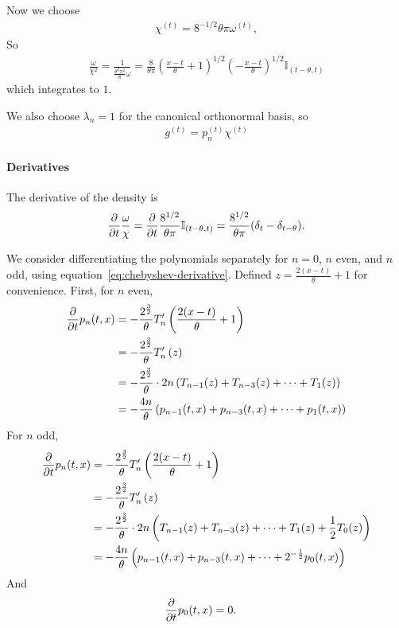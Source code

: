 \documentclass[../../hippo]{subfiles}
\begin{document}
Now we choose
\begin{align*}
  \chi^{(t)} = 8^{-1/2} \theta \pi \omega^{(t)},
\end{align*}
So
\begin{align*}
  \frac{\omega}{\chi^2} = \frac{1}{\frac{\theta^2\pi^2}{8}\omega} = \frac{8}{\theta \pi} \left( \frac{x-t}{\theta} + 1 \right)^{1/2} \left( -\frac{x-t}{\theta} \right)^{1/2} \mathbb{I}_{(t-\theta, t)}
\end{align*}
which integrates to $1$.


We also choose $\lambda_n = 1$ for the canonical orthonormal basis, so
\begin{align*}
  g^{(t)} = p_n^{(t)} \chi^{(t)}
\end{align*}


\paragraph{Derivatives}

The derivative of the density is
\begin{align*}
  \frac{\partial}{\partial t} \frac{\omega}{\chi} = \frac{\partial}{\partial t} \frac{8^{1/2}}{\theta\pi}\mathbb{I}_{(t-\theta, t)} = \frac{8^{1/2}}{\theta\pi}(\delta_t - \delta_{t-\theta}).
\end{align*}

We consider differentiating the polynomials separately for $n = 0$, $n$ even, and $n$ odd,
using equation~\eqref{eq:chebyshev-derivative}.
Defined $z = \frac{2(x-t)}{\theta} + 1$ for convenience.
First, for $n$ even,
\begin{align*}%
  \ppt p_n(t, x) &= -\frac{2^{\frac{3}{2}}}{\theta} T_n'\left( \frac{2(x-t)}{\theta} + 1 \right)
  \\
  &= -\frac{2^{\frac{3}{2}}}{\theta} T_n'\left( z \right)
  \\
  &= -\frac{2^{\frac{3}{2}}}{\theta} \cdot 2n \left( T_{n-1}(z) + T_{n-3}(z) + \dots + T_1(z) \right)
  \\&
  = -\frac{4n}{\theta} \left( p_{n-1}(t, x) + p_{n-3}(t, x) + \dots + p_1(t, x) \right)
\end{align*}
For $n$ odd,
\begin{align*}%
  \ppt p_n(t, x) &= -\frac{2^{\frac{3}{2}}}{\theta} T_n'\left( \frac{2(x-t)}{\theta} + 1 \right)
  \\
  &= -\frac{2^{\frac{3}{2}}}{\theta} T_n'\left( z \right)
  \\
  &= -\frac{2^{\frac{3}{2}}}{\theta} \cdot 2n \left( T_{n-1}(z) + T_{n-3}(z) + \dots + T_1(z) + \frac{1}{2}T_0(z) \right)
  \\&
  = -\frac{4n}{\theta} \left( p_{n-1}(t, x) + p_{n-3}(t, x) + \dots + 2^{-\frac{1}{2}}p_0(t, x) \right)
\end{align*}
And
\begin{align*}
  \frac{\partial}{\partial t} p_0(t, x) &= 0.
\end{align*}
\end{document}
